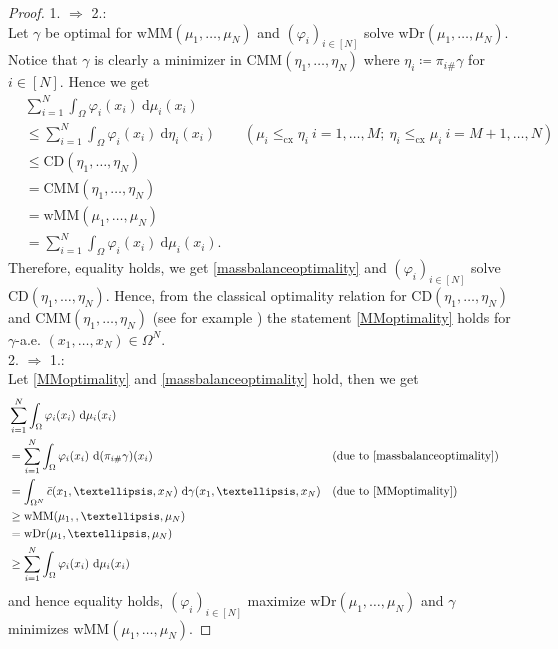 \documentclass[10pt,a4paper]{amsart}
\newcommand{\dd}{\mathrm{d}}
\begin{document}
\begin{proof}
	1. $\Rightarrow$ 2.:\\
	Let $\gamma$ be optimal for $\text{wMM}(\mu_1,\dots,\mu_N)$ and $(\varphi_i)_{i\in[N]}$ solve $\text{wDr}(\mu_1,\dots,\mu_N)$. Notice that $\gamma$ is clearly a minimizer in $\text{CMM}(\eta_1,\dots,\eta_N)$ where $\eta_i\coloneqq \pi_{i\#}\gamma$ for $i\in[N]$.
	Hence we get
	\begin{align*}
		&\sum_{i=1}^N\int_\Omega\varphi_i(x_i)\ \dd\mu_i(x_i)\\
		&\leq\sum_{i=1}^N\int_\Omega\varphi_i(x_i)\ \dd\eta_i(x_i)&&(\mu_i\leq_{\text{cx}}\eta_i\ i=1,\dots,M;\ \eta_i\leq_{\text{cx}}\mu_i\ i=M+1,\dots,N)\\
		&\leq\text{CD}(\eta_1,\dots,\eta_N)\\
		&=\text{CMM}(\eta_1,\dots,\eta_N)\\
		&=\text{wMM}(\mu_1,\dots,\mu_N)\\
		&=\sum_{i=1}^N\int_\Omega\varphi_i(x_i)\ \dd\mu_i(x_i).
	\end{align*}
	Therefore, equality holds, we get \eqref{massbalanceoptimality}
	and $(\varphi_i)_{i\in[N]}$ solve $\text{CD}(\eta_1,\dots,\eta_N)$. Hence, from the classical optimality relation for $\text{CD}(\eta_1,\dots,\eta_N)$ and $\text{CMM}(\eta_1,\dots,\eta_N)$ (see for example \cite[Prop 2.3]{kim2014}) the statement
	\eqref{MMoptimality}
	holds for $\gamma$-a.e. $(x_1,\dots,x_N)\in\Omega^N$.\\
	2. $\Rightarrow$ 1.:\\
	Let \eqref{MMoptimality} and \eqref{massbalanceoptimality} hold, then we get
	\begin{align*}
		&\sum_{i=1}^N\int_\Omega\varphi_i(x_i)\ \dd\mu_i(x_i)\\
		&=\sum_{i=1}^N\int_\Omega\varphi_i(x_i)\ \dd(\pi_{i\#}\gamma)(x_i)&&(\text{due to \eqref{massbalanceoptimality}})\\
		&=\int_{\Omega^N}\bar c(x_1,\dots,x_N)\ \dd\gamma(x_1,\dots,x_N)&&(\text{due to \eqref{MMoptimality}})\\
		&\geq\text{wMM}(\mu_1,,\dots,\mu_N)\\
		&=\text{wDr}(\mu_1,\dots,\mu_N)\\
		&\geq\sum_{i=1}^N\int_\Omega\varphi_i(x_i)\ \dd\mu_i(x_i)
	\end{align*}
	and hence equality holds, $(\varphi_i)_{i\in[N]}$ maximize $\text{wDr}(\mu_1,\dots,\mu_N)$ and $\gamma$ minimizes $\text{wMM}(\mu_1,\dots,\mu_N)$.
\end{proof}
\end{document}
